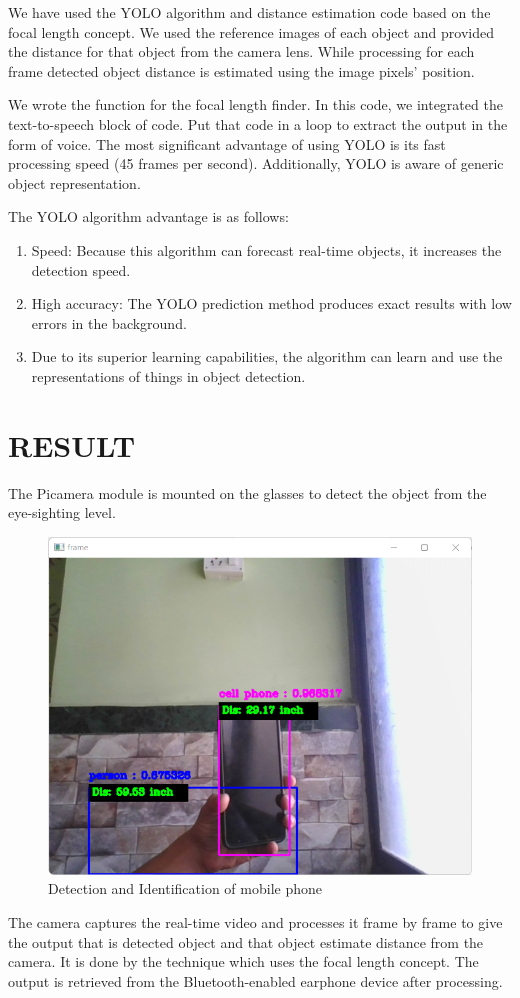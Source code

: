 \documentclass[conference]{IEEEtran}
\begin{document}
We have used the YOLO algorithm and distance estimation code based on the focal length concept. We used the reference images of each object and provided the distance for that object from the camera lens. While processing for each frame detected object distance is estimated using the image pixels' position. 

We wrote the function for the focal length finder. In this code, we integrated the text-to-speech block of code. Put that code in a loop to extract the output in the form of voice. The most significant advantage of using YOLO is its fast processing speed (45 frames per second). Additionally, YOLO is aware of generic object representation. 

The YOLO algorithm advantage is as follows:
\begin{enumerate}[\IEEEsetlabelwidth{12)}]
\item Speed: Because this algorithm can forecast real-time
objects, it increases the detection speed.
\item High accuracy: The YOLO prediction method produces
exact results with low errors in the background.
\item Due to its superior learning capabilities, the algorithm can learn and use the representations of things in object detection.
\end{enumerate}

\section{RESULT}

The Picamera module is mounted on the glasses to detect the object from the eye-sighting level. 

\begin{figure}[h]
\centering
\includegraphics[width=2.5in\textwidth]{2023-02-12 14_13_19-frame_300_DPI.png}
\caption{Detection and Identification of mobile phone}
\label{fig_sim}
\end{figure}

The camera captures the real-time video and processes it frame by frame to give the output that is detected object and that object estimate distance from the camera. It is done by the technique which uses the focal length concept. The output is retrieved from the Bluetooth-enabled earphone device after processing.
\end{document}
